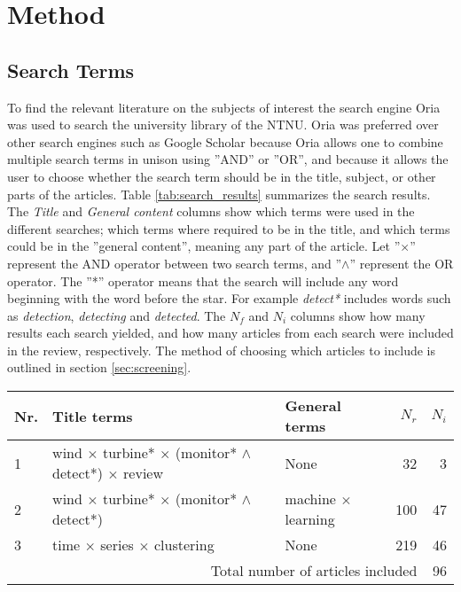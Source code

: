 \newpage
\chapter{Method}

\section{Search Terms}
To find the relevant literature on the subjects of interest the search engine Oria was used to search the university library of the NTNU. 
Oria was preferred over other search engines such as Google Scholar because Oria allows one to combine multiple search terms in unison using ''AND'' or ''OR'', and because it allows the user to choose whether the search term should be in the title, subject, or other parts of the articles. 
Table \ref{tab:search_results} summarizes the search results. 
The \textit{Title} and \textit{General content} columns show which terms were used in the different searches; which terms where required to be in the title, and which terms could be in the ''general content'', meaning any part of the article. 
Let ''$\times$'' represent the AND operator between two search terms, and ''$\wedge$'' represent the OR operator. 
The ''*'' operator means that the search will include any word beginning with the word before the star.
For example \textit{detect*} includes words such as \textit{detection}, \textit{detecting} and \textit{detected}. 
The $N_f$ and $N_i$ columns show how many results each search yielded, and how many articles from each search were included in the review, respectively. 
The method of choosing which articles to include is outlined in section \ref{sec:screening}. \bigskip 

\begin{table*}[h]
    \centering
    \begin{tabular}{ lllrr } 
        \toprule
        Nr. & Title terms & General terms & $N_r$ & $N_i$ \\
        \midrule
        1 & wind $\times$ turbine* $\times$ (monitor* $\wedge{}$ detect*) $\times$ review & None & 32 & 3 \\
        2 & wind $\times$ turbine* $\times$ (monitor* $\wedge{}$ detect*) & machine $\times$ learning & 100 & 47 \\ 
        3 & time $\times$ series $\times$ clustering & None & 219 & 46 \\ 
        \midrule
        \multicolumn{4}{r}{Total number of articles included} & 96 \\
        \bottomrule
    \end{tabular}
    \caption{Search results}
    \label{tab:search_results}
\end{table*}

